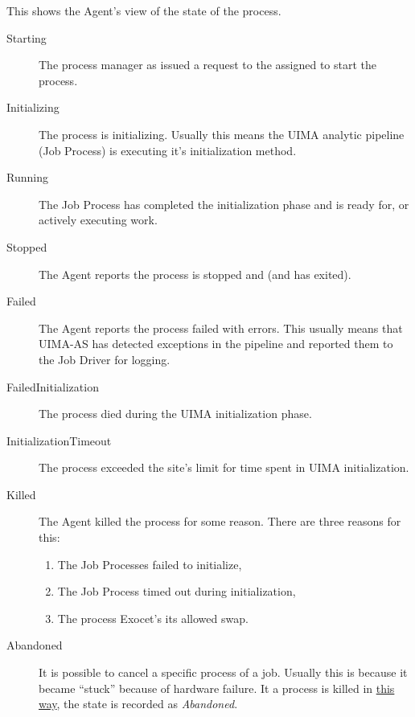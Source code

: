 \begin{description}
            This shows the {\DUCC} Agent's view of the state of the process.
            \begin{description}
               \item[Starting] The {\DUCC} process manager as issued a request to the assigned to
                 start the process.
               \item[Initializing] The process is initializing.  Usually this means the UIMA analytic
                 pipeline (Job Process) is executing it's initialization method.
              \item[Running] The Job Process has completed the initialization phase and is ready for, 
                or actively executing work.
              \item[Stopped] The {\DUCC} Agent reports the process is stopped and (and has exited).
              \item[Failed] The {\DUCC} Agent reports the process failed with errors.  This usually
                means that UIMA-AS has detected exceptions in the pipeline and reported them
                to the Job Driver for logging.
              \item[FailedInitialization] The process died during the UIMA initialization phase.
              \item[InitializationTimeout] The process exceeded the site's limit for time spent
                in UIMA initialization.
              \item[Killed] The {\DUCC} Agent killed the process for some reason.  There are
                three reasons for this:
                \begin{enumerate}
                  \item The Job Processes failed to initialize,
                  \item The Job Process timed out during initialization,
                  \item The process Exocet's its allowed swap.
                \end{enumerate}
              \item[Abandoned] It is possible to cancel a specific process of a job.  Usually
                this is because it became ``stuck'' because of hardware failure.  It a process
                is killed in \hyperref[sec:cli.ducc-cancel]{this way}, the state is recorded as {\em Abandoned}.
            \end{description}
            

\end{description}
